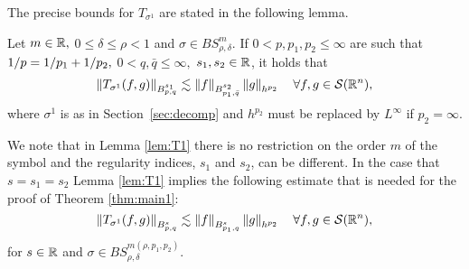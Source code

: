 The precise bounds for $T_{\sigma^1}$ are stated in the following lemma.

\begin{lemma}\label{lem:T1} Let $m \in \re,$  $0 \le \delta\le  \rho < 1$ and $\sigma \in BS^m_{\rho, \delta}$. If   $0<p,p_1,p_2\le \infty$ are such that $\hcline,$ $0 < q ,\bar{q}\leq \infty,$ $s_1, s_2 \in \re$, it holds that
\begin{equation}\label{eq:estT1}
\norm{T_{\sigma^1}(f,g)}{\ibes{p}{s_1}{q}}  \lesssim \norm{f}{\ibes{p_1}{s_2}{\bar{q}}} \norm{g}{h^{p_2}} \quad \forall f, g \in \sw,
\end{equation}
where $\sigma^1$ is as in Section~\ref{sec:decomp} and $h^{p_2}$ must be replaced by $L^\infty$ if $p_2=\infty.$
\end{lemma}


We note that in Lemma \ref{lem:T1} there is no restriction on the order $m$ of the symbol and the regularity indices, $s_1$ and $s_2$, can be different. In the case that $s=s_1=s_2$ Lemma \ref{lem:T1} implies the following estimate that is needed for the proof of Theorem \ref{thm:main1}: 
$$\norm{T_{\sigma^1}(f,g)}{\ibes{p}{s}{q}}  \lesssim \norm{f}{\ibes{p_1}{s}{q}} \norm{g}{h^{p_2}} \quad \forall f, g \in \sw,$$
for $s\in\re$ and $\sigma\in BS^{m(\rho,p_1,p_2)}_{\rho,\delta}$.



